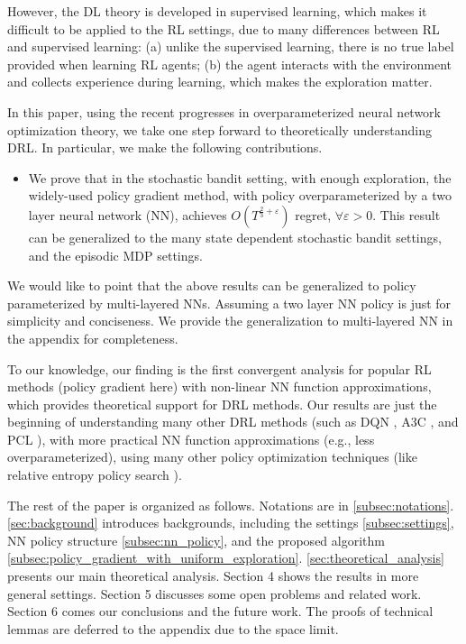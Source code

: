 However, the DL theory is developed in supervised learning, which makes it difficult to be applied to the RL settings, due to many differences between RL and supervised learning: (a) unlike the supervised learning, there is no true label provided when learning RL agents; (b) the agent interacts with the environment and collects experience during learning, which makes the exploration matter.

In this paper, using the recent progresses in overparameterized neural network optimization theory, we take one step forward to theoretically understanding DRL. In particular, we make the following contributions.
\begin{itemize}
    \item We prove that in the stochastic bandit setting, with enough exploration, the widely-used policy gradient method, with policy overparameterized by a two layer neural network (NN), achieves $O\left( T^{\frac{2}{3} + \varepsilon} \right)$ regret, $\forall \varepsilon > 0$. This result can be generalized to the many state dependent stochastic bandit settings, and the episodic MDP settings.
\end{itemize}

We would like to point that the above results can be generalized to policy parameterized by multi-layered NNs. Assuming a two layer NN policy is just for simplicity and conciseness. We provide the generalization to multi-layered NN in the appendix for completeness.

To our knowledge, our finding is the first convergent analysis for popular RL methods (policy gradient here) with non-linear NN function approximations, which provides theoretical support for DRL methods. Our results are just the beginning of understanding many other DRL methods (such as DQN \cite{mnih2015human}, A3C \citep{mnih2016asynchronous}, and PCL \citep{nachum2017bridging}), with more practical NN function approximations (e.g., less overparameterized), using many other policy optimization techniques (like relative entropy policy search \citep{peters2010relative}).

The rest of the paper is organized as follows. Notations are in \cref{subsec:notations}. \cref{sec:background} introduces backgrounds, including the settings \cref{subsec:settings}, NN policy structure \cref{subsec:nn_policy}, and the proposed algorithm \cref{subsec:policy_gradient_with_uniform_exploration}. \cref{sec:theoretical_analysis} presents our main theoretical analysis. Section 4 shows the results in more general settings. Section 5 discusses some open problems and related work. Section 6 comes our conclusions and the future work. The proofs of technical lemmas are deferred to the appendix due to the space limit.


